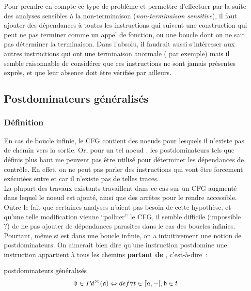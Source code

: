 Pour prendre en compte ce type de problème et permettre d'effectuer par la suite
des analyses sensibles à la non-terminaison ({\it non-terminaison sensitive}),
il faut ajouter des dépendances à toutes les instructions qui suivent
une construction qui peut ne pas terminer comme un appel de fonction,
ou une boucle dont on ne sait pas déterminer la terminaison.
Dans l'absolu, il faudrait aussi s'intéresser aux autres instructions qui ont
une terminaison anormale ( par exemple) mais il semble
raisonnable de considérer que ces instructions ne sont jamais présentes exprès,
et que leur absence doit être vérifiée par ailleurs.

\subsection{Postdominateurs généralisés}

\subsubsection{Définition}

En cas de boucle infinie, le CFG contient des noeuds pour lesquels
il n'existe pas de chemin vers la sortie.
Or, pour un tel noeud ,
les postdominateurs tels que définis plus haut me peuvent pas être utilisé
pour déterminer les dépendances de contrôle.
En effet, on ne peut pas parler des instructions qui vont être
forcement exécutées entre  et \nE{} car il n'existe pas de telles traces.\\

La plupart des travaux existants travaillent dans ce cas sur un CFG augmenté
dans lequel le noeud \nE{} est ajouté, ainsi que des arrêtes pour le rendre
accessible. Outre le fait que certaines analyses n'aient pas besoin de cette
hypothèse, et qu'une telle modification vienne ``polluer'' le CFG,
il semble difficile (impossible ?) de ne pas ajouter
de dépendances parasites dans le cas des boucles infinies.\\

Pourtant, même si  est dans une boucle infinie,
on a intuitivement une notion de postdominateurs. On aimerait bien dire
qu'une instruction  postdomine une instruction  \ssi {} appartient
à tous les chemins {\bf partant de }, c'est-à-dire~:

\begin{definition}{postdominateurs généralisés}
$$ \mathfrak{b} \in \mathit{Pd}^{\infty}(\mathfrak{a}) \Leftrightarrow{def} \forall t \in \llbracket a, -[, \mathfrak{b} \in t $$
\end{definition}


